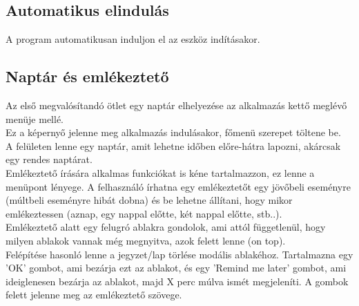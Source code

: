 \subsection{Automatikus elindulás}
A program automatikusan induljon el az eszköz indításakor.

\subsection{Naptár és emlékeztető}
Az első megvalósítandó ötlet egy naptár elhelyezése az alkalmazás kettő meglévő menüje mellé.
\\Ez a képernyő jelenne meg alkalmazás indulásakor, főmenü szerepet töltene be.
\vspace{5pt}\\A felületen lenne egy naptár, amit lehetne időben előre-hátra lapozni, akárcsak egy rendes naptárat.
\vspace{5pt}\\Emlékeztető írására alkalmas funkciókat is kéne tartalmazzon, ez lenne a menüpont lényege. A felhasználó írhatna egy emlékeztetőt egy jövőbeli eseményre (múltbeli eseményre hibát dobna) és be lehetne állítani, hogy mikor emlékeztessen (aznap, egy nappal előtte, két nappal előtte, stb..).
\vspace{5pt}\\Emlékeztető alatt egy felugró ablakra gondolok, ami attól függetlenül, hogy milyen ablakok vannak még megnyitva, azok felett lenne (on top). 
\\Felépítése hasonló lenne a jegyzet/lap törlése modális ablakéhoz.
Tartalmazna egy 'OK' gombot, ami bezárja ezt az ablakot, és egy 'Remind me later' gombot, ami ideiglenesen bezárja az ablakot, majd X perc múlva ismét megjeleníti. A gombok felett jelenne meg az emlékeztető szövege.


